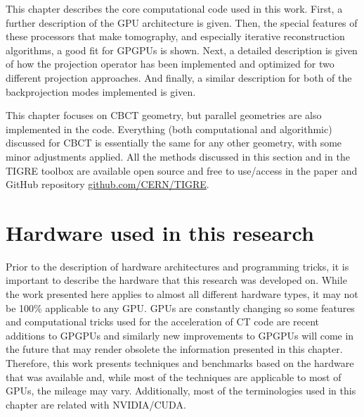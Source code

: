 
This chapter describes the core computational code used in this work. First, a further description of the GPU architecture is given. Then, the special features of these processors that make tomography, and especially iterative reconstruction algorithms, a good fit for GPGPUs is shown. Next, a detailed description is given of how the projection operator has been implemented and optimized for two different projection approaches.  And finally, a similar description for both of the backprojection modes implemented is given.


This chapter focuses on CBCT geometry, but parallel geometries are also implemented in the code. Everything (both computational and algorithmic) discussed for CBCT is essentially the same for any other geometry, with some minor adjustments applied. All the methods discussed in this section and in the TIGRE toolbox are available open source and free to use/access in the paper\cite{TIGRE} and GitHub repository \href{https://github.com/CERN/TIGRE}{github.com/CERN/TIGRE}.

\section{Hardware used in this research}
Prior to the description of hardware architectures and programming tricks, it is important to describe the hardware that this research was developed on. While the work presented here applies to almost all different hardware types, it may not be 100\% applicable to any GPU. GPUs are constantly changing so some features and computational tricks used for the acceleration of CT code are recent additions to GPGPUs and similarly new improvements to GPGPUs will come in the future that may render obsolete the information presented in this chapter. Therefore, this work presents techniques and benchmarks based on the hardware that was available and, while most of the techniques are applicable to most of GPUs, the mileage may vary. Additionally, most of the terminologies used in this chapter are related with NVIDIA/CUDA.

